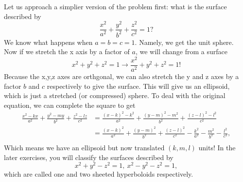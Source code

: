 Let us approach a simplier version of the problem first: what is the surface described by \[
    \frac{x^2}{a^2}+\frac{y^2}{b^2}+\frac{z^2}{c^2}=1?
\]
We know what happens when $a=b=c=1$. Namely, we get the unit sphere. Now if we stretch the x axis by a factor of $a$, we will change from a surface \[
    x^2+y^2+z^2=1 \to \frac{x^2}{a^2}+y^2+z^2=1!
\]
Because the x,y,z axes are orthgonal, we can also stretch the y and z axes by a factor $b$ and $c$ respectively to give the surface. This will give us an ellipsoid, which is just a stretched (or compressed) sphere. To deal with the original equation, we can complete the square to get \begin{align*}
    \frac{x^2-kx}{a^2}+\frac{y^2-my}{b^2}+\frac{z^2-lz}{c^2}&=  \frac{(x-k)^2-k^2}{a^2}+\frac{(y-m)^2-m^2}{b^2}+\frac{(z-l)^2-l^2}{c^2}\\
    &=\frac{(x-k)^2}{a^2}+\frac{(y-m)^2}{b^2}+\frac{(z-l)^2}{c^2} -\frac{k^2}{a^2}-\frac{m^2}{b^2}-\frac{l^2}{c^2}, \\
\end{align*}
Which means we have an ellipsoid but now translated $(k,m,l)$ units!
In the later exercises, you will classify the surfaces described by \[
    x^2+y^2-z^2=1, \ x^2-y^2-z^2=1,
\]
which are called one and two sheeted hyperboloids respectively. 
